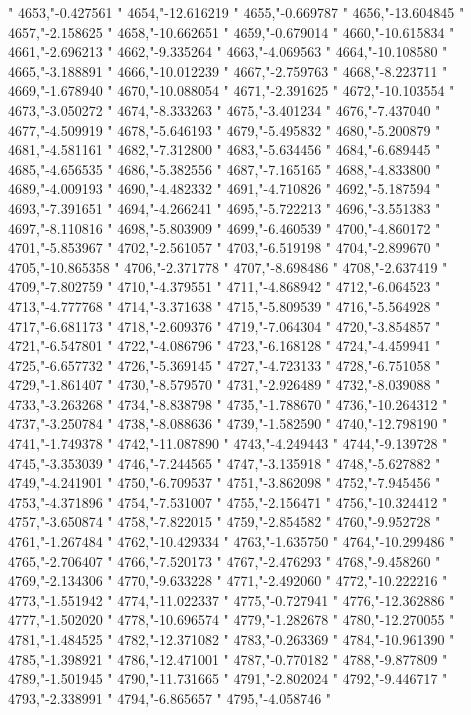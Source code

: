 "
4653,"-0.427561
"
4654,"-12.616219
"
4655,"-0.669787
"
4656,"-13.604845
"
4657,"-2.158625
"
4658,"-10.662651
"
4659,"-0.679014
"
4660,"-10.615834
"
4661,"-2.696213
"
4662,"-9.335264
"
4663,"-4.069563
"
4664,"-10.108580
"
4665,"-3.188891
"
4666,"-10.012239
"
4667,"-2.759763
"
4668,"-8.223711
"
4669,"-1.678940
"
4670,"-10.088054
"
4671,"-2.391625
"
4672,"-10.103554
"
4673,"-3.050272
"
4674,"-8.333263
"
4675,"-3.401234
"
4676,"-7.437040
"
4677,"-4.509919
"
4678,"-5.646193
"
4679,"-5.495832
"
4680,"-5.200879
"
4681,"-4.581161
"
4682,"-7.312800
"
4683,"-5.634456
"
4684,"-6.689445
"
4685,"-4.656535
"
4686,"-5.382556
"
4687,"-7.165165
"
4688,"-4.833800
"
4689,"-4.009193
"
4690,"-4.482332
"
4691,"-4.710826
"
4692,"-5.187594
"
4693,"-7.391651
"
4694,"-4.266241
"
4695,"-5.722213
"
4696,"-3.551383
"
4697,"-8.110816
"
4698,"-5.803909
"
4699,"-6.460539
"
4700,"-4.860172
"
4701,"-5.853967
"
4702,"-2.561057
"
4703,"-6.519198
"
4704,"-2.899670
"
4705,"-10.865358
"
4706,"-2.371778
"
4707,"-8.698486
"
4708,"-2.637419
"
4709,"-7.802759
"
4710,"-4.379551
"
4711,"-4.868942
"
4712,"-6.064523
"
4713,"-4.777768
"
4714,"-3.371638
"
4715,"-5.809539
"
4716,"-5.564928
"
4717,"-6.681173
"
4718,"-2.609376
"
4719,"-7.064304
"
4720,"-3.854857
"
4721,"-6.547801
"
4722,"-4.086796
"
4723,"-6.168128
"
4724,"-4.459941
"
4725,"-6.657732
"
4726,"-5.369145
"
4727,"-4.723133
"
4728,"-6.751058
"
4729,"-1.861407
"
4730,"-8.579570
"
4731,"-2.926489
"
4732,"-8.039088
"
4733,"-3.263268
"
4734,"-8.838798
"
4735,"-1.788670
"
4736,"-10.264312
"
4737,"-3.250784
"
4738,"-8.088636
"
4739,"-1.582590
"
4740,"-12.798190
"
4741,"-1.749378
"
4742,"-11.087890
"
4743,"-4.249443
"
4744,"-9.139728
"
4745,"-3.353039
"
4746,"-7.244565
"
4747,"-3.135918
"
4748,"-5.627882
"
4749,"-4.241901
"
4750,"-6.709537
"
4751,"-3.862098
"
4752,"-7.945456
"
4753,"-4.371896
"
4754,"-7.531007
"
4755,"-2.156471
"
4756,"-10.324412
"
4757,"-3.650874
"
4758,"-7.822015
"
4759,"-2.854582
"
4760,"-9.952728
"
4761,"-1.267484
"
4762,"-10.429334
"
4763,"-1.635750
"
4764,"-10.299486
"
4765,"-2.706407
"
4766,"-7.520173
"
4767,"-2.476293
"
4768,"-9.458260
"
4769,"-2.134306
"
4770,"-9.633228
"
4771,"-2.492060
"
4772,"-10.222216
"
4773,"-1.551942
"
4774,"-11.022337
"
4775,"-0.727941
"
4776,"-12.362886
"
4777,"-1.502020
"
4778,"-10.696574
"
4779,"-1.282678
"
4780,"-12.270055
"
4781,"-1.484525
"
4782,"-12.371082
"
4783,"-0.263369
"
4784,"-10.961390
"
4785,"-1.398921
"
4786,"-12.471001
"
4787,"-0.770182
"
4788,"-9.877809
"
4789,"-1.501945
"
4790,"-11.731665
"
4791,"-2.802024
"
4792,"-9.446717
"
4793,"-2.338991
"
4794,"-6.865657
"
4795,"-4.058746
"
